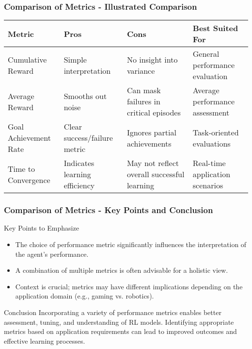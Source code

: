 \documentclass[aspectratio=169]{beamer}
\begin{document}
\begin{frame}[fragile]
    \frametitle{Comparison of Metrics - Illustrated Comparison}
    \begin{tabular}{|l|l|l|l|}
        \hline
        \textbf{Metric} & \textbf{Pros} & \textbf{Cons} & \textbf{Best Suited For} \\
        \hline
        Cumulative Reward & Simple interpretation & No insight into variance & General performance evaluation \\
        \hline
        Average Reward & Smooths out noise & Can mask failures in critical episodes & Average performance assessment \\
        \hline
        Goal Achievement Rate & Clear success/failure metric & Ignores partial achievements & Task-oriented evaluations \\
        \hline
        Time to Convergence & Indicates learning efficiency & May not reflect overall successful learning & Real-time application scenarios \\
        \hline
    \end{tabular}
\end{frame}

\begin{frame}[fragile]
    \frametitle{Comparison of Metrics - Key Points and Conclusion}
    \begin{block}{Key Points to Emphasize}
        \begin{itemize}
            \item The choice of performance metric significantly influences the interpretation of the agent's performance.
            \item A combination of multiple metrics is often advisable for a holistic view.
            \item Context is crucial; metrics may have different implications depending on the application domain (e.g., gaming vs. robotics).
        \end{itemize}
    \end{block}

    \begin{block}{Conclusion}
        Incorporating a variety of performance metrics enables better assessment, tuning, and understanding of RL models. 
        Identifying appropriate metrics based on application requirements can lead to improved outcomes and effective learning processes.
    \end{block}
\end{frame}
\end{document}
